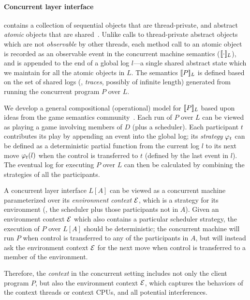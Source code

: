 \paragraph{Concurrent layer interface}
contains a collection of
sequential objects that are thread-private,
and abstract {\em atomic} objects that are shared~\cite{Herlihy08book}. Unlike calls to thread-private abstract objects  which are not {\em observable} by other
threads, each method call to an atomic object is recorded as an 
observable event in the concurrent machine semantics
($\sem{L}{\cdot}$), and is appended to the end of a global log $l$---a
single shared abstract state which we maintain for all the atomic
objects in $L$. The semantics $\sem{L}{P}$ is defined based
on the set of shared logs (\ie, {\em{}traces}, possibly of
infinite length) generated from running the concurrent program $P$
over $L$.

We develop a general compositional (operational) model for
$\sem{L}{P}$ based upon ideas from the game semantics
community~\cite{gsinvite}. Each run of $P$ over $L$ can be viewed as
playing a game involving members of $D$ (plus a scheduler). Each
participant $t$ contributes its play by appending an event into the
global log; its {\em strategy} $\strat{t}$ can be defined as a
deterministic partial function from the current log $l$ to its next
move $\strat{t}(l)$ when the control is transferred to $t$
(defined by the last event in $l$). The
eventual log for executing $P$ over $L$ can then be calculated by
combining the strategies of all the participants.

A concurrent layer interface $L[A]$ can be viewed as a concurrent machine
parameterized over its {\em environment context} $\oracle$, which is a
strategy for its environment (\ie, the scheduler plus those
participants not in $A$).  Given an environment context $\oracle$
which also contains a particular scheduler strategy, the execution of
$P$ over $L[A]$ should be deterministic; the concurrent machine will
run $P$ when control is transferred to any of the participants in $A$, but
will instead ask the environment context $\oracle$ for the next move when 
control is transferred to a member of the environment.

Therefore, the \emph{context} in the concurrent
setting includes not only the client program $P$,
but also the environment context $\oracle$,
which captures the behaviors
of the context threads or context CPUs,
and all potential interferences.

